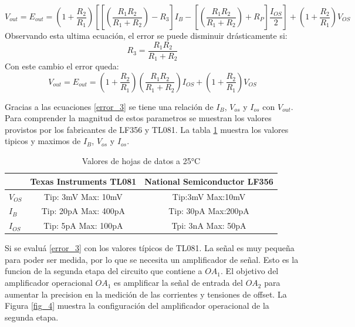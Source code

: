 \documentclass[12pt,a4paper]{article}
\begin{document}
\begin{equation} V_{out} = E_{out} = (1+\frac{R_2}{R_1})[[(\frac{R_1R_2}{R_1+R_2})-R_3]I_B - [(\frac{R_1R_2}{R_1+R_2})+R_P]\frac {I_{OS}}{2}] + (1+\frac{R_2}{R_1})V_{OS} \end{equation}
    Observando esta ultima ecuación, el error se puede disminuir drásticamente si:
\begin{equation} R_3 = \frac{R_1R_2}{R_1+R_2} \label{arreglo_1}\end{equation}
Con este cambio el error queda:
\begin{equation} V_{out} = E_{out} = (1+\frac{R_2}{R_1})(\frac{R_1R_2}{R_1+R_2})I_{OS} + (1+\frac{R_2}{R_1})V_{OS}  \label{error_3}\end{equation}


Gracias a las ecuaciones \ref{error_3} se tiene una relación  de $I_B$, $V_{os}$ y $I_{os}$ con $V_{out}$. Para comprender la magnitud de estos parametros se muestran los valores provistos por los fabricantes
de LF356 y TL081. La tabla \ref{hoja_datos} muestra los valores tipicos y maximos de $I_B$, $V_{os}$ y $I_{os}$.

\begin{table}[h!]
    \centering
    \caption{Valores de hojas de datos a 25°C}
    \label{hoja_datos}

    \begin{tabular}{@{}lcc@{}}
        & \multicolumn{1}{l}{Texas Instruments TL081} & \multicolumn{1}{r}{National Semiconductor LF356} \\ \midrule
    \textbf{$V_{OS}$} & Tip: 3mV Max: 10mV      & Tip:3mV Max:10mV             \\
    \textbf{$I_B$}  & Tip: 20pA Max: 400pA    & Tip: 30pA Max:200pA          \\
    \textbf{$I_{OS}$} & Tip: 5pA Max: 100pA     & Tpi: 3nA Max: 50pA          
    \end{tabular}
    \end{table}

    



Si se evaluá \ref{error_3} con los valores típicos de TL081. La señal es muy pequeña para poder ser medida, por lo que se necesita un amplificador de señal. Esto es la funcion de la segunda etapa del circuito que contiene a 
$OA_1$. El objetivo del amplificador operacional $OA_1$ es amplificar la señal de entrada del $OA_2$ para aumentar la precision en la medición de las corrientes y tensiones de offset. La Figura \ref{fig_4} muestra la configuración del amplificador operacional de la segunda etapa.
\end{document}
